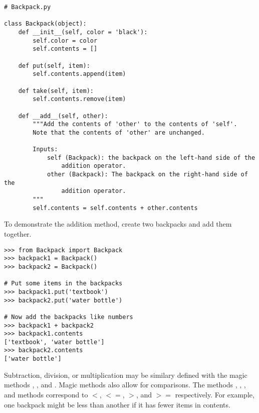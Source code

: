 \begin{lstlisting}
# Backpack.py

class Backpack(object):
    def __init__(self, color = 'black'):
        self.color = color
        self.contents = []

    def put(self, item):
        self.contents.append(item)

    def take(self, item):
        self.contents.remove(item)

    def __add__(self, other):
        """Add the contents of 'other' to the contents of 'self'.
        Note that the contents of 'other' are unchanged.
        
        Inputs:
            self (Backpack): the backpack on the left-hand side of the
                addition operator.
            other (Backpack): The backpack on the right-hand side of the
                addition operator.
        """
        self.contents = self.contents + other.contents
\end{lstlisting}

To demonstrate the addition method, create two backpacks and add them together.

\begin{lstlisting}
>>> from Backpack import Backpack
>>> backpack1 = Backpack()
>>> backpack2 = Backpack()

# Put some items in the backpacks
>>> backpack1.put('textbook')
>>> backpack2.put('water bottle')

# Now add the backpacks like numbers
>>> backpack1 + backpack2
>>> backpack1.contents
['textbook', 'water bottle']
>>> backpack2.contents
['water bottle']
\end{lstlisting}

Subtraction, division, or multiplication may be similary defined with the magic methods , , and .
Magic methods also allow for comparisons.
The methods , , , and  methods correspond to $<$, $<=$, $>$, and $>=$ respectively.
For example, one backpack might be less than another if it has fewer items in contents.

